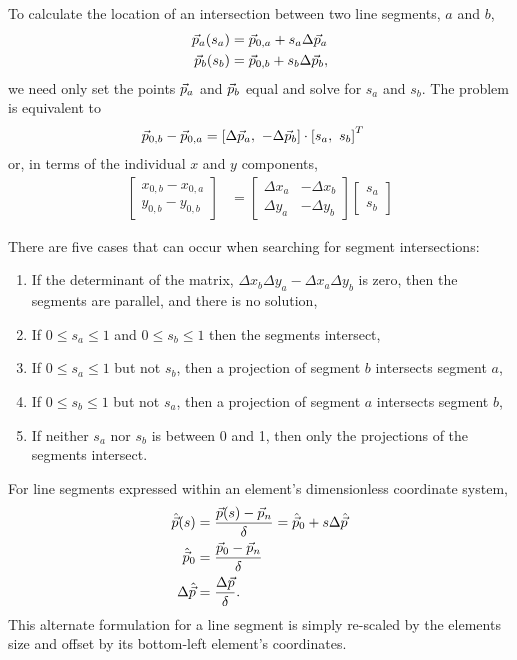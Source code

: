To calculate the location of an intersection between two line segments, $a$ and $b$,
\begin{align}
\vec{p}_a(s_a) &= \vec{p}_{0,a} + s_a \Delta \vec{p}_a\nonumber\\
\vec{p}_b(s_b) &= \vec{p}_{0,b} + s_b \Delta \vec{p}_b\nonumber,
\end{align}
we need only set the points $\vec{p}_a$ and $\vec{p}_b$ equal and solve for $s_a$ and $s_b$.  The problem is equivalent to
\begin{align}
\vec{p}_{0,b} - \vec{p}_{0,a} &= \left[\Delta \vec{p}_a,\ -\Delta \vec{p}_b\right] \cdot \left[s_a,\ s_b\right]^T
\end{align}
or, in terms of the individual $x$ and $y$ components,
\begin{align}
\left[\begin{array}{c}
x_{0,b} - x_{0,a}\\
y_{0,b} - y_{0,b}
\end{array}\right] &= 
\left[\begin{array}{cc}
\Delta x_a & -\Delta x_b\\
\Delta y_a & -\Delta y_b
\end{array}\right]\left[\begin{array}{c}
s_a \\
s_b
\end{array}\right]
\end{align}

There are five cases that can occur when searching for segment intersections:
\begin{enumerate}
\item If the determinant of the matrix, $\Delta x_b \Delta y_a - \Delta x_a \Delta y_b$ is zero, then the segments are parallel, and there is no solution,
\item If $0 \le s_a \le 1$ and $0 \le s_b \le 1$ then the segments intersect,
\item If $0 \le s_a \le 1$ but not $s_b$, then a projection of segment $b$ intersects segment $a$,
\item If $0 \le s_b \le 1$ but not $s_a$, then a projection of segment $a$ intersects segment $b$,
\item If neither $s_a$ nor $s_b$ is between 0 and 1, then only the projections of the segments intersect.
\end{enumerate}

For line segments expressed within an element's dimensionless coordinate system,
\begin{align}
\hat{\vec{p}}(s) &= \frac{\vec{p}(s) - \vec{p}_n}{\delta} = \hat{\vec{p}}_0 + s\Delta \hat{\vec{p}}\\
\hat{\vec{p}}_0 &= \frac{\vec{p}_0 - \vec{p}_n}{\delta}\nonumber\\
\Delta \hat{\vec{p}} &= \frac{\Delta \vec{p}}{\delta}\nonumber.
\end{align}
This alternate formulation for a line segment is simply re-scaled by the elements size and offset by its bottom-left element's coordinates.

